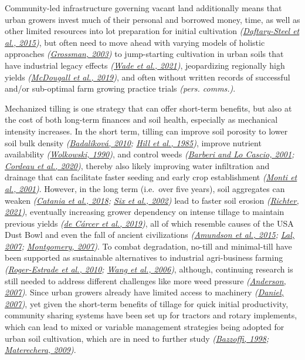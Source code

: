 \documentclass[
  12pt,
]{article}
\begin{document}
Community-led infrastructure governing vacant land additionally means that urban growers invest much of their personal and borrowed money, time, as well as other limited resources into lot preparation for initial cultivation \emph{(\protect\hyperlink{ref-daftary-steel15}{Daftary-Steel et al., 2015})},
but often need to move ahead with varying models of holistic approaches \emph{(\protect\hyperlink{ref-grossman03}{Grossman, 2003})} to jump-starting cultivation in urban soils that have industrial legacy effects \emph{(\protect\hyperlink{ref-wade21}{Wade et al., 2021})}, jeopardizing regionally high yields \emph{(\protect\hyperlink{ref-mcdougall19}{McDougall et al., 2019})}, and often without written records of successful and/or sub-optimal farm growing practice trials \emph{(pers. comms.)}.

Mechanized tilling is one strategy that can offer short-term benefits, but also at the cost of both long-term finances and soil health, especially as mechanical intensity increases.
In the short term, tilling can improve soil porosity to lower soil bulk density \emph{(\protect\hyperlink{ref-badalikova10}{Badalíková, 2010}; \protect\hyperlink{ref-hill85}{Hill et al., 1985})}, improve nutrient availability \emph{(\protect\hyperlink{ref-wolkowski90}{Wolkowski, 1990})}, and control weeds \emph{(\protect\hyperlink{ref-barberi01}{Barberi and Lo Cascio, 2001}; \protect\hyperlink{ref-cordeau20}{Cordeau et al., 2020})}, thereby also likely improving water infiltration and drainage that can facilitate faster seeding and early crop establishment \emph{(\protect\hyperlink{ref-monti01}{Monti et al., 2001})}.
However, in the long term (i.e.~over five years), soil aggregates can weaken \emph{(\protect\hyperlink{ref-catania18}{Catania et al., 2018}; \protect\hyperlink{ref-six02a}{Six et al., 2002})} lead to faster soil erosion \emph{(\protect\hyperlink{ref-richter21}{Richter, 2021})}, eventually increasing grower dependency on intense tillage to maintain previous yields \emph{(\protect\hyperlink{ref-decarcer19}{de Cárcer et al., 2019})}, all of which resemble causes of the USA Dust Bowl and even the fall of ancient civilizations \emph{(\protect\hyperlink{ref-amundson15}{Amundson et al., 2015}; \protect\hyperlink{ref-lal07}{Lal, 2007}; \protect\hyperlink{ref-montgomery07}{Montgomery, 2007})}.
To combat degradation, no-till and minimal-till have been supported as sustainable alternatives to industrial agri-business farming \emph{(\protect\hyperlink{ref-roger-estrade10}{Roger-Estrade et al., 2010}; \protect\hyperlink{ref-wang06}{Wang et al., 2006})}, although, continuing research is still needed to address different challenges like more weed pressure \emph{(\protect\hyperlink{ref-anderson07}{Anderson, 2007})}.
Since urban growers already have limited access to machinery \emph{(\protect\hyperlink{ref-daniel07}{Daniel, 2007})}, yet given the short-term benefits of tillage for quick initial productivity, community sharing systems have been set up for tractors and rotary implements, which can lead to mixed or variable management strategies being adopted for urban soil cultivation, which are in need to further study \emph{(\protect\hyperlink{ref-bazzoffi98}{Bazzoffi, 1998}; \protect\hyperlink{ref-materechera09}{Materechera, 2009})}.
\end{document}
